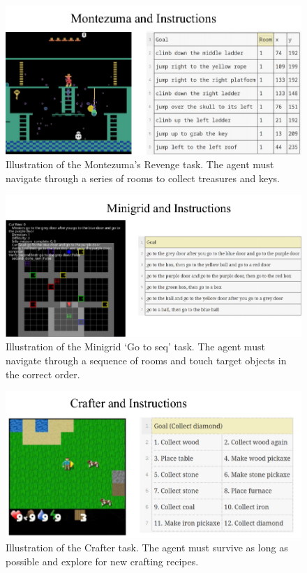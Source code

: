 \documentclass{article}
\theoremstyle{plain}
\theoremstyle{definition}
\theoremstyle{remark}
\begin{document}
\begin{figure}[H]
    \centering
    \includegraphics[width=0.63\columnwidth]{appendix_figures/montezuma_task_illu.pdf}
    \caption{Illustration of the Montezuma's Revenge task. The agent must navigate through a series of rooms to collect treasures and keys.}
\end{figure}

\begin{figure}[H]
    \centering
    \includegraphics[width=0.7\columnwidth]{appendix_figures/minigrid_task_illu.pdf}
    \caption{Illustration of the Minigrid `Go to seq' task. The agent must navigate through a sequence of rooms and touch target objects in the correct order.}
\end{figure}

\begin{figure}[H]
    \centering
    \includegraphics[width=0.67\columnwidth]{appendix_figures/crafter_task_illu.pdf}
    \caption{Illustration of the Crafter task. The agent must survive as long as possible and explore for new crafting recipes.}
\end{figure}
\end{document}
